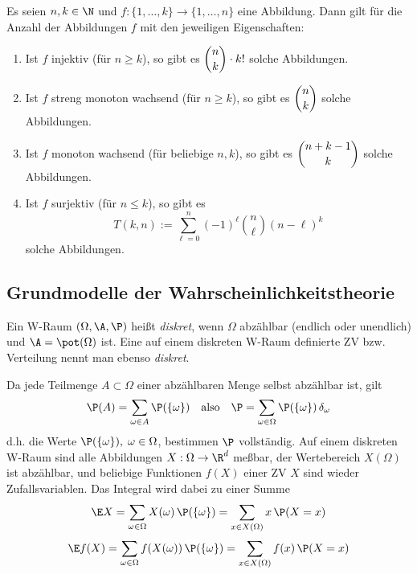 \documentclass[11pt, a4paper]{article}
\begin{document}
\begin{theorem}\Theorem
    Es seien $n,k \in \N$ und $f: \{1,\ldots,k\} \to \{1,\ldots,n\}$ eine Abbildung. Dann gilt für die Anzahl der Abbildungen $f$ mit den jeweiligen Eigenschaften:
    \begin{enumerate}[label=\alph*)]
        \item Ist $f$ injektiv (für $n\geqslant k$), so gibt es $\dbinom{n}{k}\cdot k!$ solche Abbildungen.
        \item Ist $f$ streng monoton wachsend (für $n\geqslant k$), so gibt es $\dbinom{n}{k}$ solche Abbildungen.
        \item Ist $f$ monoton wachsend (für beliebige $n,k$), so gibt es $\dbinom{n+k-1}{k}$ solche Abbildungen.
        \item Ist $f$ surjektiv (für $n\leqslant k$), so gibt es
        $$T(k,n) := \sum_{\ell=0}^{n} (-1)^\ell \binom{n}{\ell}(n-\ell)^k$$
        solche Abbildungen.
    \end{enumerate}
\end{theorem}


\subsection{Grundmodelle der Wahrscheinlichkeitstheorie}

\begin{definition}\Theorem
    Ein W-Raum $(\Omega, \A, \P)$ heißt \emph{diskret}, wenn $\Omega$ abzählbar (endlich oder unendlich) und $\A = \pot(\Omega)$ ist. Eine auf einem diskreten W-Raum definierte ZV bzw. Verteilung nennt man ebenso \emph{diskret}.
\end{definition}

\begin{note}
    Da jede Teilmenge $A \subset \Omega$ einer abzählbaren Menge selbst abzählbar ist, gilt
    $$\P(A) = \sum_{\omega \in A} \P(\{\omega\}) \quad \text{also} \quad \P = \sum_{\omega \in \Omega} \P(\{\omega\}) \, \delta_\omega$$
    d.h. die Werte $\P(\{\omega\}), \; \omega \in \Omega$, bestimmen $\P$ vollständig. Auf einem diskreten W-Raum sind alle Abbildungen $X: \Omega \to \R^d$ meßbar, der Wertebereich $X(\Omega)$ ist abzählbar, und beliebige Funktionen $f(X)$ einer ZV $X$ sind wieder Zufallsvariablen. Das Integral wird dabei zu einer Summe
    $$\E X = \sum_{\omega \in \Omega} X(\omega) \, \P(\{\omega\}) = \sum_{x \in X(\Omega)} x \, \P(X = x) $$
    $$\E f(X) = \sum_{\omega \in \Omega} f(X(\omega)) \, \P(\{\omega\}) = \sum_{x \in X(\Omega)} f(x) \, \P(X = x)$$

\end{note}
\end{document}
